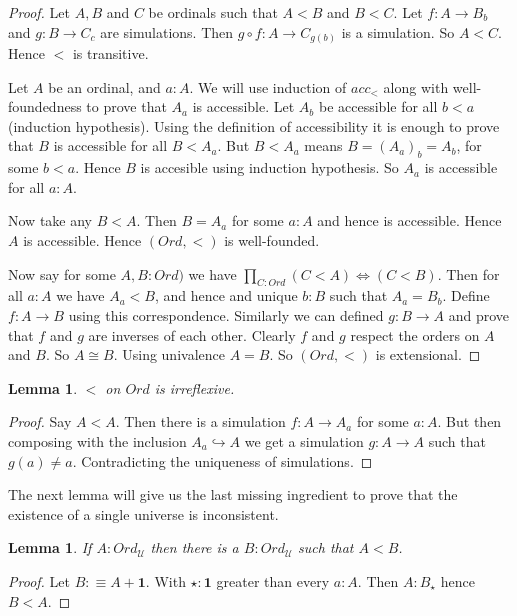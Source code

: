 \documentclass[11pt]{article}
\theoremstyle{definition}
\theoremstyle{plain}
\newtheorem{lemma}[definition]{Lemma}
\theoremstyle{remark}
\newcommand{\U}{\mathscr{U}}
\begin{document}
\begin{proof}
Let $A,B$ and $C$ be ordinals such that $A<B$ and $B<C$. Let $f : A \to B_b$ and $g : B\to C_c$
are simulations. Then $g \circ f : A \to C_{g(b)}$ is a simulation. So $A < C$. Hence 
$<$ is transitive. \smallskip

Let $A$ be an ordinal, and $a : A$. We will use induction of $acc_<$ along with 
well-foundedness to prove that $A_a$ is accessible. Let $A_b$ be accessible for all $b < a$
(induction hypothesis). Using the definition of accessibility it is enough to prove that 
$B$ is accessible for all $B < A_a$. But $B < A_a$ means $B = (A_a)_b = A_b$, for some 
$b < a$. Hence $B$ is accesible using induction hypothesis. So $A_a$ is accessible for
all $a : A$.\smallskip

Now take any $B < A$. Then $B = A_a$ for some $a : A$ and hence is accessible. Hence $A$ is
accessible. Hence $(Ord,<)$ is well-founded.\smallskip

Now say for some $A,B : Ord)$ we have $\prod_{C : Ord} (C < A) \iff (C < B)$. Then for all
$a : A$ we have $A_a < B$, and hence and unique $b : B$ such that $A_a = B_b$. Define 
$f : A \to B$  using this correspondence. Similarly we can defined $g : B \to A$ and prove
that $f$ and $g$ are inverses of each other. Clearly $f$ and $g$ respect the orders on
$A$ and $B$. So $A \cong B$. Using univalence $A = B$. So $(Ord, <)$ is extensional.
\end{proof}

\begin{lemma}
$<$ on $Ord$ is irreflexive.
\end{lemma}

\begin{proof}
Say $A < A$. Then there is a simulation $f : A \to A_a$ for some $a : A$. But then composing
with the inclusion $A_a \hookrightarrow A$ we get a simulation $g : A \to A$ such that
$g(a) \neq a$. Contradicting the uniqueness of simulations.
\end{proof}

The next lemma will give us the last missing ingredient to prove that the existence of a single
universe is inconsistent.

\begin{lemma}\label{L:succ of ord}
If $A : Ord_{\U}$ then there is a $B : Ord_{\U}$ such that $A < B$. 
\end{lemma}

\begin{proof}
Let $B :\equiv A + \mathbf{1}$. With $\star : \mathbf{1}$ greater than every $a : A$. Then
$A : B_{\star}$ hence $B < A$.
\end{proof}
\end{document}
